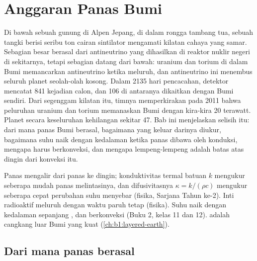 \chapter{Anggaran Panas Bumi}\label{ch:b1:heat-budget}

Di bawah sebuah gunung di Alpen Jepang, di dalam rongga tambang tua, sebuah tangki berisi seribu ton cairan sintilator mengamati kilatan cahaya yang samar. Sebagian besar berasal dari antineutrino yang dihasilkan di reaktor nuklir negeri di sekitarnya, tetapi sebagian datang dari bawah: uranium dan torium di dalam Bumi memancarkan antineutrino ketika meluruh, dan antineutrino ini menembus seluruh planet seolah-olah kosong. Dalam 2135 hari pencacahan, detektor mencatat 841 kejadian calon, dan 106 di antaranya dikaitkan dengan Bumi sendiri. Dari segenggam kilatan itu, timnya memperkirakan pada 2011 bahwa peluruhan uranium dan torium memanaskan Bumi dengan kira-kira 20 terawatt. Planet secara keseluruhan kehilangan sekitar 47. Bab ini menjelaskan selisih itu: dari mana panas Bumi berasal, bagaimana  yang keluar darinya diukur, bagaimana suhu naik dengan kedalaman ketika panas dibawa oleh konduksi, mengapa  harus berkonveksi, dan mengapa lempeng-lempeng adalah batas atas dingin dari konveksi itu.

\begin{recall}
Panas mengalir dari panas ke dingin; konduktivitas termal batuan $k$ mengukur seberapa mudah panas melintasinya, dan difusivitasnya $\kappa = k/(\rho c)$ mengukur seberapa cepat perubahan suhu menyebar (fisika, Sarjana Tahun ke-2). Inti radioaktif meluruh dengan waktu paruh tetap (fisika). Suhu naik dengan kedalaman sepanjang , dan  berkonveksi (Buku 2, kelas 11 dan 12).  adalah cangkang luar Bumi yang kuat (\cref{ch:b1:layered-earth}).
\end{recall}

\section{Dari mana panas berasal}

